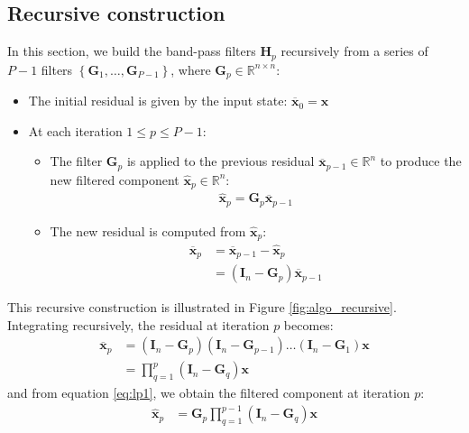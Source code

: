 \documentclass[12pt]{scrartcl}
\begin{document}
\subsection{Recursive construction}
In this section, we build the band-pass filters $\mathbf{H}_p$ recursively from a series of $P-1$ filters $\left\{\mathbf{G}_1,\dots,\mathbf{G}_{P-1}\right\}$, where $\mathbf{G}_p \in \mathbb{R}^{n \times n}$:
\begin{itemize}
\item The initial residual is given by the input state: $\overline{\mathbf{x}}_0 = \mathbf{x}$
\item At each iteration $1 \le p \le P-1$:
\begin{itemize}
\item The filter $\mathbf{G}_p$ is applied to the previous residual $\overline{\mathbf{x}}_{p-1} \in \mathbb{R}^n$ to produce the new filtered component $\widehat{\mathbf{x}}_p \in \mathbb{R}^{n}$:
\begin{align}
\label{eq:lp1}
\widehat{\mathbf{x}}_p = \mathbf{G}_p \overline{\mathbf{x}}_{p-1}
\end{align}
\item The new residual is computed from $\widehat{\mathbf{x}}_p$:
\begin{align}
\label{eq:lp2}
\overline{\mathbf{x}}_p & = \overline{\mathbf{x}}_{p-1} - \widehat{\mathbf{x}}_p \nonumber \\
& = \left(\mathbf{I}_n - \mathbf{G}_p\right) \overline{\mathbf{x}}_{p-1}
\end{align}
\end{itemize}
\end{itemize}
This recursive construction is illustrated in Figure \ref{fig:algo_recursive}. Integrating recursively, the residual at iteration $p$ becomes:
\begin{align}
\label{eq:lp3}
\overline{\mathbf{x}}_p & = \left(\mathbf{I}_n - \mathbf{G}_p\right) \left(\mathbf{I}_n - \mathbf{G}_{p-1}\right) \dots \left(\mathbf{I}_n - \mathbf{G}_1\right) \mathbf{x} \nonumber \\
& = \displaystyle \prod_{q=1}^p \left(\mathbf{I}_n - \mathbf{G}_q\right) \mathbf{x}
\end{align}
and from equation \eqref{eq:lp1}, we obtain the filtered component at iteration $p$:
\begin{align}
\label{eq:lp4}
\widehat{\mathbf{x}}_p & = \mathbf{G}_p \prod_{q=1}^{p-1} \left(\mathbf{I}_n - \mathbf{G}_q\right) \mathbf{x}
\end{align}
\end{document}
